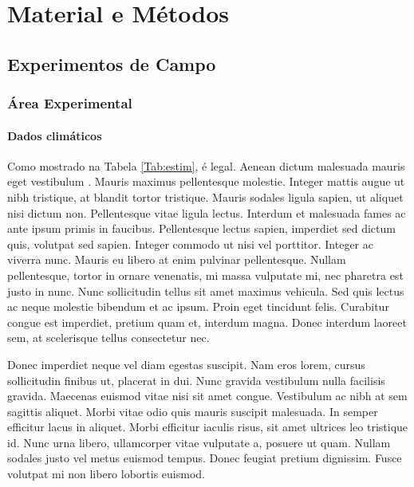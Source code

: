 \documentclass[book,A4paper,10pt,twoside,oldfontcommands]{memoir}\usepackage[]{graphicx}\usepackage[usenames,dvipsnames]{color}
\begin{document}

\chapter{Material e Métodos}

\section{Experimentos de Campo}

\subsection{Área Experimental}

\subsubsection{Dados climáticos}

Como mostrado na Tabela \ref{Tab:estim}, é legal. Aenean dictum
malesuada mauris eget vestibulum \citep{Cockerham1996}. Mauris maximus
pellentesque molestie. Integer mattis augue ut nibh tristique, at
blandit tortor tristique. Mauris sodales ligula sapien, ut aliquet
nisi dictum non. Pellentesque vitae ligula lectus. Interdum et
malesuada fames ac ante ipsum primis in faucibus. Pellentesque lectus
sapien, imperdiet sed dictum quis, volutpat sed sapien. Integer
commodo ut nisi vel porttitor. Integer ac viverra nunc. Mauris eu
libero at enim pulvinar pellentesque. Nullam pellentesque, tortor in
ornare venenatis, mi massa vulputate mi, nec pharetra est justo in
nunc. Nunc sollicitudin tellus sit amet maximus vehicula. Sed quis
lectus ac neque molestie bibendum et ac ipsum. Proin eget tincidunt
felis. Curabitur congue est imperdiet, pretium quam et, interdum
magna. Donec interdum laoreet sem, at scelerisque tellus consectetur
nec.


Donec imperdiet neque vel diam egestas suscipit. Nam eros lorem,
cursus sollicitudin finibus ut, placerat in dui. Nunc gravida
vestibulum nulla facilisis gravida. Maecenas euismod vitae nisi sit
amet congue. Vestibulum ac nibh at sem sagittis aliquet. Morbi vitae
odio quis mauris suscipit malesuada. In semper efficitur lacus in
aliquet. Morbi efficitur iaculis risus, sit amet ultrices leo
tristique id. Nunc urna libero, ullamcorper vitae vulputate a, posuere
ut quam. Nullam sodales justo vel metus euismod tempus. Donec feugiat
pretium dignissim. Fusce volutpat mi non libero lobortis euismod. 
\end{document}
